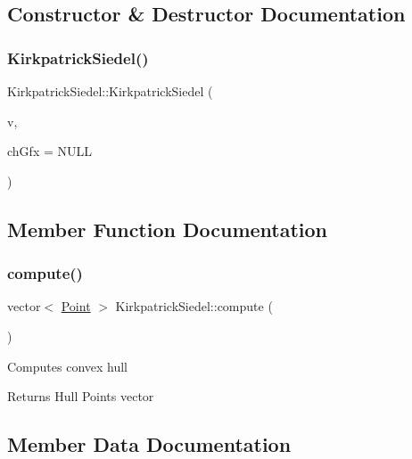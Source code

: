 \subsection{Constructor \& Destructor Documentation}
\mbox{\label{class_kirkpatrick_siedel_a5a565c7cf3c861544bc4a4360ba007ca}} 
\subsubsection{\texorpdfstring{KirkpatrickSiedel()}{KirkpatrickSiedel()}}
{\footnotesize\ttfamily Kirkpatrick\+Siedel\+::\+Kirkpatrick\+Siedel (\begin{DoxyParamCaption}\item[{vector$<$ \mbox{\hyperlink{class_point}{Point}} $>$}]{v,  }\item[{\mbox{\hyperlink{class_convex_hull_graphix}{Convex\+Hull\+Graphix}} $\ast$}]{ch\+Gfx = {\ttfamily NULL} }\end{DoxyParamCaption})}



\subsection{Member Function Documentation}
\mbox{\label{class_kirkpatrick_siedel_ac301f763865d166ed8e049547adeeb44}} 
\subsubsection{\texorpdfstring{compute()}{compute()}}
{\footnotesize\ttfamily vector$<$ \mbox{\hyperlink{class_point}{Point}} $>$ Kirkpatrick\+Siedel\+::compute (\begin{DoxyParamCaption}{ }\end{DoxyParamCaption})}

Computes convex hull \begin{DoxyReturn}{Returns}
Hull Points vector 
\end{DoxyReturn}


\subsection{Member Data Documentation}
\mbox{\label{class_kirkpatrick_siedel_a408d71282f26da0ee4ba9d62a63e73d2}} 
